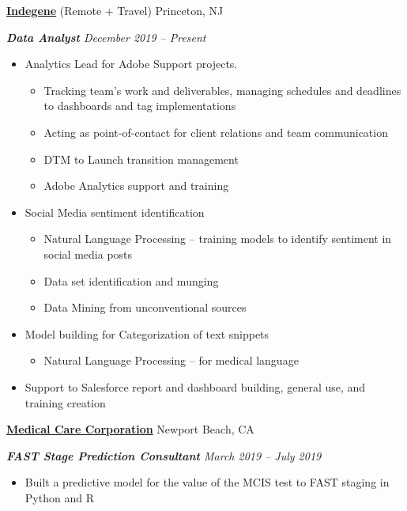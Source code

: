 \documentclass[9pt,letterpaper]{article}
\newcommand{\sectionHead}[1]{\vspace{.7ex} \noindent {\large \textbf{#1} \titlerule[.4pt]}}%
\begin{document}
	\sectionHead{Work History}
	\begin{description}[noitemsep]
		\item \textbf{\ul{Indegene}} \hfill (Remote + Travel) Princeton, NJ
		\item {\textit{\textbf{Data Analyst} \hfill December 2019 -- Present}}
		\begin{itemize}[noitemsep]
			\item Analytics Lead for Adobe Support projects.
			\begin{itemize}
				\item Tracking team’s work and deliverables, managing schedules and deadlines to dashboards and tag implementations
				\item Acting as point-of-contact for client relations and team communication
				\item DTM to Launch transition management
				\item Adobe Analytics support and training
			\end{itemize}
			\item Social Media sentiment identification
			\begin{itemize}
				\item Natural Language Processing – training models to identify sentiment in social media posts
				\item Data set identification and munging
				\item Data Mining from unconventional sources
			\end{itemize}
			\item Model building for Categorization of text snippets
			\begin{itemize}
				\item Natural Language Processing – for medical language
			\end{itemize}
			\item Support to Salesforce report and dashboard building, general use, and training creation
		\end{itemize}
		\item \textbf{\ul{Medical Care Corporation}} \hfill Newport Beach, CA
		\item {\textit{\textbf{FAST Stage Prediction Consultant} \hfill March 2019 -- July 2019}}
		\begin{itemize}[noitemsep]
			\item Built a predictive model for the value of the MCIS test to FAST staging in Python and R
			\begin{itemize}

\end{itemize}
\end{itemize}
\end{description}
\end{document}
